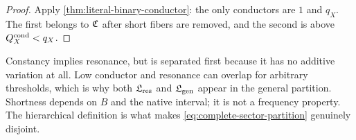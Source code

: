 \begin{proof}
Apply \cref{thm:literal-binary-conductor}: the only conductors are
\(1\) and \(q_X\).  The first belongs to \(\mathfrak C\) after short
fibers are removed, and the second is above
\(Q_X^{\rm cond}<q_X\).
\end{proof}

\begin{remark}
Constancy implies resonance, but is separated first because it has
no additive variation at all.  Low conductor and resonance can
overlap for arbitrary thresholds, which is why both
\(\mathfrak L_{\rm res}\) and \(\mathfrak L_{\rm gen}\) appear in the general partition.
Shortness depends on \(B\) and the native interval; it is not a
frequency property.  The hierarchical definition is what makes
\eqref{eq:complete-sector-partition} genuinely disjoint.
\end{remark}
